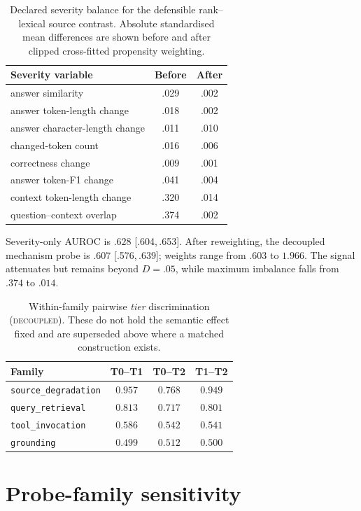 \documentclass{article}
\newcommand{\ci}[2]{{\footnotesize[#1,\,#2]}}
\begin{document}
\begin{table}[h]
\centering\scriptsize
\caption{Declared severity balance for the defensible rank--lexical source contrast. Absolute
standardised mean differences are shown before and after clipped cross-fitted propensity
weighting.}
\label{tab:severity-balance}
\begin{tabular}{@{}lcc@{}}
\toprule
Severity variable & Before & After \\
\midrule
answer similarity & .029 & .002 \\
answer token-length change & .018 & .002 \\
answer character-length change & .011 & .010 \\
changed-token count & .016 & .006 \\
correctness change & .009 & .001 \\
answer token-F1 change & .041 & .004 \\
context token-length change & .320 & .014 \\
question--context overlap & .374 & .002 \\
\bottomrule
\end{tabular}
\end{table}

Severity-only AUROC is $.628$ \ci{.604}{.653}. After reweighting, the decoupled mechanism
probe is $.607$ \ci{.576}{.639}; weights range from $.603$ to $1.966$. The signal attenuates
but remains beyond $D=.05$, while maximum imbalance falls from $.374$ to $.014$.

\begin{table}[h]
\centering\small
\caption{Within-family pairwise \emph{tier} discrimination (\textsc{decoupled}). These do not
hold the semantic effect fixed and are superseded above where a matched construction exists.}
\begin{tabular}{@{}lccc@{}}
\toprule
Family & T0--T1 & T0--T2 & T1--T2 \\
\midrule
\texttt{source\_degradation} & $0.957$ & $0.768$ & $0.949$ \\
\texttt{query\_retrieval}    & $0.813$ & $0.717$ & $0.801$ \\
\texttt{tool\_invocation}    & $0.586$ & $0.542$ & $0.541$ \\
\texttt{grounding}           & $0.499$ & $0.512$ & $0.500$ \\
\bottomrule
\end{tabular}
\end{table}

\section{Probe-family sensitivity}
\label{app:probes}
\end{document}
